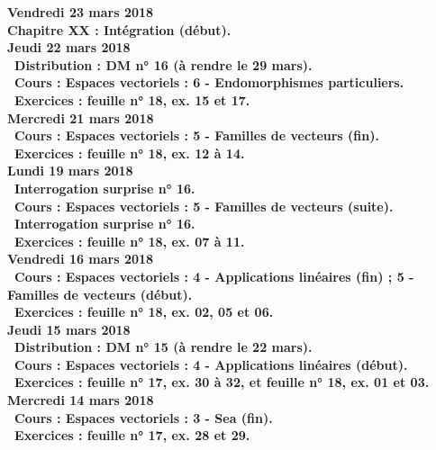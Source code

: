 \documentclass[12pt,a4paper]{article}
\begin{document}
\noindent\textbf{Vendredi 23 mars 2018}\\
\bf Chapitre XX \rm : Intégration (début).\vspace{.4cm}\\

\noindent\textbf{Jeudi 22 mars 2018}\\
\bu\ Distribution : DM n° 16 (à rendre le 29 mars).\\
\bu\ Cours : Espaces vectoriels : 6 - Endomorphismes particuliers.\\
\bu\ Exercices : feuille n° 18, ex. 15 et 17.\vspace{.4cm}\\

\noindent\textbf{Mercredi 21 mars 2018} \\
\bu\ Cours : Espaces vectoriels : 5 - Familles de vecteurs (fin).\\
\bu\ Exercices : feuille n° 18, ex. 12 à 14.\vspace{.4cm}\\

\noindent\textbf{\bf Lundi 19 mars 2018} \\
\bu\ Interrogation surprise n° 16.\\
\bu\ Cours : Espaces vectoriels : 5 - Familles de vecteurs (suite).\\
\bu\ Interrogation surprise n° 16.\\
\bu\ Exercices : feuille n° 18, ex. 07 à 11.\vspace{.4cm}\\

\noindent\textbf{Vendredi 16 mars 2018}\\
\bu\ Cours : Espaces vectoriels : 4 - Applications linéaires (fin) ; 5 - Familles de vecteurs (début).\\
\bu\ Exercices : feuille n° 18, ex. 02, 05 et 06.\vspace{.4cm}\\

\noindent\textbf{Jeudi 15 mars 2018}\\
\bu\ Distribution : DM n° 15 (à rendre le 22 mars).\\
\bu\ Cours : Espaces vectoriels : 4 - Applications linéaires (début).\\
\bu\ Exercices : feuille n° 17, ex. 30 à 32, et feuille n° 18, ex. 01 et 03.\vspace{.4cm}\\

\noindent\textbf{Mercredi 14 mars 2018} \\
\bu\ Cours : Espaces vectoriels : 3 - Sea (fin).\\
\bu\ Exercices : feuille n° 17, ex. 28 et 29.\vspace{.4cm}\\
\end{document}
